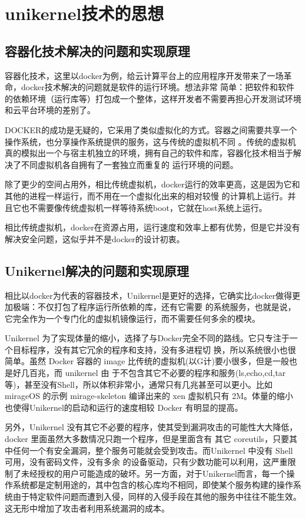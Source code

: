 \chapter{unikernel技术的思想}

\section{容器化技术解决的问题和实现原理}

容器化技术，这里以docker为例，给云计算平台上的应用程序开发带来了一场革命，docker技术解决的问题就是软件的运行环境。想法非常
简单：把软件和软件的依赖环境（运行库等）打包成一个整体，这样开发者不需要再担心开发测试环境和云平台环境的差别了。

DOCKER的成功是无疑的，它采用了类似虚拟化的方式。容器之间需要共享一个操作系统，也分享操作系统提供的服务，这与传统的虚拟机不同
。传统的虚拟机真的模拟出一个与宿主机独立的环境，拥有自己的软件和库，容器化技术相当于解决了不同虚拟机各自拥有了一套独立而重复的
运行环境的问题。

除了更少的空间占用外，相比传统虚拟机，docker运行的效率更高，这是因为它和其他的进程一样运行，而不用在一个虚拟化出来的相对较慢
的计算机上运行。并且它也不需要像传统虚拟机一样等待系统boot，它就在host系统上运行。

相比传统虚拟机，docker在资源占用，运行速度和效率上都有优势，但是它并没有解决安全问题，这似乎并不是docker的设计初衷。

\section{Unikernel解决的问题和实现原理}

相比以docker为代表的容器技术，Unikernel是更好的选择，它确实比docker做得更加极端：不仅打包了程序运行所依赖的库，还有它需要
的系统服务，也就是说，它完全作为一个专门化的虚拟机镜像运行，而不需要任何多余的模块。

Unikernel 为了实现体量的缩小，选择了与Docker完全不同的路线。它只专注于一个目标程序，没有其它冗余的程序和支持，没有多进程切
换，所以系统很小也很简单。虽然 Docker 容器的 image 比传统的虚拟机(以G计)要小很多，但是一般也是好几百兆，而 unikernel 由
于不包含其它不必要的程序和服务(ls,echo,cd,tar等)，甚至没有Shell，所以体积非常小，通常只有几兆甚至可以更小。比如 mirageOS
的示例 mirage-skeleton 编译出来的 xen 虚拟机只有 2M。体量的缩小也使得Unikernel的启动和运行的速度相较 Docker 有明显的提高。

另外，Unikernel 没有其它不必要的程序，使其受到漏洞攻击的可能性大大降低，docker 里面虽然大多数情况只跑一个程序，但是里面含有
其它 coreutils，只要其中任何一个有安全漏洞，整个服务可能就会受到攻击。而Unikernel 中没有 Shell 可用，没有密码文件，没有多余
的设备驱动，只有少数功能可以利用，这严重限制了未经授权的用户可能造成的破坏。另一方面，对于Unikernel而言，每一个操作系统都是定制用途的，其中包含的核心库均不相同，即使某个服务构建的操作系统由于特定软件问题而遭到入侵，同样的入侵手段在其他的服务中往往不能生效。这无形中增加了攻击者利用系统漏洞的成本。

